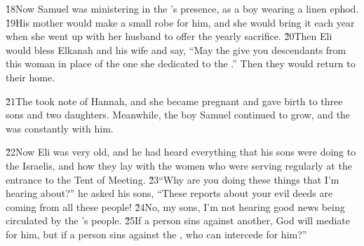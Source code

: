 \v{18}Now Samuel was ministering in the 's presence, as a boy wearing a linen ephod. \v{19}His mother would make a small robe for him, and she would bring it each year when she went up with her husband to offer the yearly sacrifice. \v{20}Then Eli would bless Elkanah and his wife and say, ``May the  give you descendants from this woman in place of the one she dedicated to the .'' Then they would return to their home.

\v{21}The  took note of Hannah, and she became pregnant and gave birth to three sons and two daughters. Meanwhile, the boy Samuel continued to grow, and the  was constantly with him.

\v{22}Now Eli was very old, and he had heard everything that his sons were doing to the Israelis, and how they lay with the women who were serving regularly at the entrance to the Tent of Meeting. \v{23}``Why are you doing these things that I'm hearing about?'' he asked his sons, ``These reports about your evil deeds are coming from all these people! \v{24}No, my sons, I'm not hearing good news being circulated by the 's people. \v{25}If a person sins against another, God will mediate for him, but if a person sins against the , who can intercede for him?''


